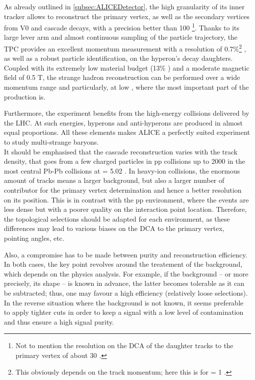 As already outlined in \Sec\ref{subsec:ALICEDetector}, the high granularity of its inner tracker allows to reconstruct the primary vertex, as well as the secondary vertices from V0 and cascade decays, with a precision better than 100 \mum\footnote{Not to mention the resolution on the DCA of the daughter tracks to the primary vertex of about 30 \mum \cite{alicecollaborationPerformanceALICEExperiment2014}.}. Thanks to its large lever arm and almost continuous sampling of the particle trajectory, the TPC 
provides an excellent momentum measurement with a resolution of 0.7\%\footnote{This obviously depends on the track momentum; here this is for \pT = 1 \gmom.} \cite{alicecollaborationALICEPhysicsPerformance2006}, as well as a robust particle identification, on the hyperon's decay daughters. Coupled with its extremely low material budget (13\% \Xzero) and a moderate magnetic field of 0.5 T, the strange hadron reconstruction can be performed over a wide momentum range and particularly, at low \pT, where the most important part of the production is.

Furthermore, the experiment benefits from the high-energy collisions delivered by the LHC. At such energies, hyperons and anti-hyperons are produced in almost equal proportions. All these elements makes ALICE a perfectly suited experiment to study multi-strange baryons. \\

It should be emphasised that the cascade reconstruction varies with the track density, that goes from a few charged particles in pp collisions up to 2000 in the most central Pb-Pb collisions at \sqrtSnn = 5.02 \tev \cite{alicecollaborationCentralityDependenceChargedparticle2016}. In heavy-ion collisions, the enormous amount of tracks means a larger background, but also a larger number of contributor for the primary vertex determination and hence a better resolution on its position. This is in contrast with the pp environment, where the events are less dense but with a poorer quality on the interaction point location. Therefore, the topological selections should be adapted for each environment, as these differences may lead to various biases on the DCA to the primary vertex, pointing angles, etc. 

Also, a compromise has to be made between purity and reconstruction efficiency. In both cases, the key point revolves around the treatement of the background, which depends on the physics analysis. For example, if the background -- or more precisely, its shape -- is known in advance, the latter becomes tolerable as it can be subtracted; thus, one may favour a high efficiency (\ie relatively loose selections). In the reverse situation  where the background is not known, it seems preferable to apply tighter cuts in order to keep a signal with a low level of contamination and thus ensure a high signal purity.


